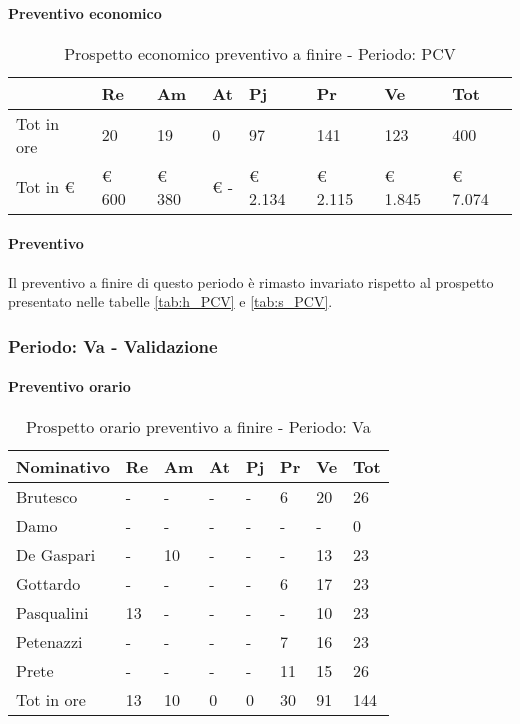 				\paragraph{Preventivo economico}
											\begin{table}[H] \begin{center} \begin{tabular}{llllllll}
											\toprule
												&	\textbf{Re}	&	\textbf{Am}	&	\textbf{At}	&	\textbf{Pj}	&	\textbf{Pr}	&	\textbf{Ve}	&	\textbf{Tot}	 \\

											\midrule															
											Tot in ore	&	20	&	19	&	0	&	97	&	141	&	123	&	400	\\
											Tot in €	&	 € 600 	 & 	 € 380 	 & 	 € -   	 & 	 € 2.134 	 & 	 € 2.115 	 & 	 € 1.845 	 & 	 € 7.074 	\\
											\bottomrule	
											\end{tabular} \end{center} \caption{Prospetto economico preventivo a finire - Periodo:
											PCV
											} \end{table}
			\paragraph{Preventivo} Il preventivo a finire di questo periodo è rimasto invariato rispetto al prospetto presentato nelle tabelle \ref{tab:h_PCV} e \ref{tab:s_PCV}.
			\newpage
		\subsubsection {Periodo: Va - Validazione}
			\paragraph{Preventivo orario}
			\begin{table}[H] \begin{center} \begin{tabular}{llllllll}
										\toprule
										\textbf{Nominativo}	&	\textbf{Re}	&	\textbf{Am}	&	\textbf{At}	&	\textbf{Pj}	&	\textbf{Pr}	&	\textbf{Ve}	&	\textbf{Tot}	 \\
										\midrule
										Brutesco	&	-	&	-	&	-	&	-	&	6	&	20	&	26	 \\
										Damo	&	-	&	-	&	-	&	-	&	-	&	-	&	0	 \\
										De Gaspari	&	-	&	10	&	-	&	-	&	-	&	13	&	23	 \\
										Gottardo	&	-	&	-	&	-	&	-	&	6	&	17	&	23	 \\
										Pasqualini	&	13	&	-	&	-	&	-	&	-	&	10	&	23	 \\
										Petenazzi	&	-	&	-	&	-	&	-	&	7	&	16	&	23	 \\
										Prete	&	-	&	-	&	-	&	-	&	11	&	15	&	26	 \\
										\midrule
										Tot in ore	&	13	&	10	&	0	&	0	&	30	&	91	&	144	 \\


										\bottomrule
										\end{tabular} \end{center} \caption{Prospetto orario preventivo a finire - Periodo:
										Va
										}\end{table}

